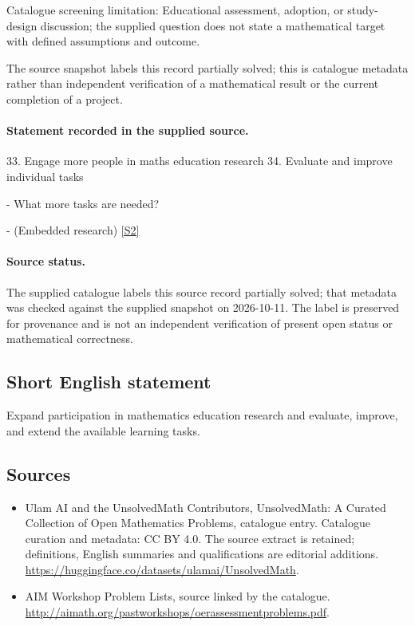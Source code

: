 \documentclass[11pt]{article}
\begin{document}
Catalogue screening limitation: Educational assessment, adoption, or study-design discussion; the supplied question does not state a mathematical target with defined assumptions and outcome.

The source snapshot labels this record partially solved; this is catalogue metadata rather than independent verification of a mathematical result or the current completion of a project.
\paragraph{Statement recorded in the supplied source.}
33. Engage more people in maths education research 34. Evaluate and improve individual tasks

- What more tasks are needed?

- (Embedded research) \href{http://aimath.org/pastworkshops/oerassessmentproblems.pdf}{[S2]}
\paragraph{Source status.}
The supplied catalogue labels this source record partially solved; that metadata was checked against the supplied snapshot on 2026-10-11. The label is preserved for provenance and is not an independent verification of present open status or mathematical correctness.
\subsection{Short English statement}
Expand participation in mathematics education research and evaluate, improve, and extend the available learning tasks.
\subsection{Sources}
\begin{itemize}
\item[S1] Ulam AI and the UnsolvedMath Contributors, UnsolvedMath: A Curated Collection of Open Mathematics Problems, catalogue entry. Catalogue curation and metadata: CC BY 4.0. The source extract is retained; definitions, English summaries and qualifications are editorial additions.
\url{https://huggingface.co/datasets/ulamai/UnsolvedMath}.
\item[S2] AIM Workshop Problem Lists, source linked by the catalogue.
\url{http://aimath.org/pastworkshops/oerassessmentproblems.pdf}.
\end{itemize}
\end{document}
